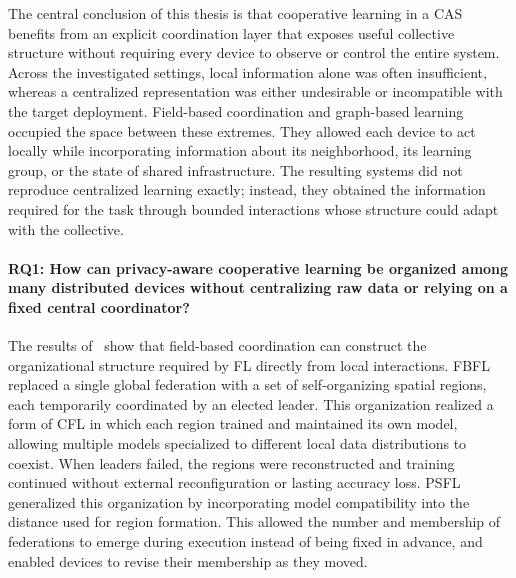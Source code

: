 The central conclusion of this thesis is that cooperative learning in a \gls{CAS} 
 benefits from an explicit coordination layer that exposes useful collective structure 
 without requiring every device to observe or control the entire system.
%
Across the investigated settings, 
 local information alone was often insufficient, 
 whereas a centralized representation was either undesirable or incompatible with the target deployment.
%
Field-based coordination and graph-based learning occupied the space 
 between these extremes. 
% 
They allowed each device to act locally while incorporating information about its neighborhood, 
 its learning group, or the state of shared infrastructure.
%
The resulting systems did not reproduce centralized learning exactly; 
 instead,
 they obtained the information required for the task through bounded interactions 
 whose structure could adapt with the collective.

\paragraph{RQ1: How can privacy-aware cooperative learning be organized among
many distributed devices without centralizing raw data or relying on a fixed
central coordinator?}
%
The results of~ show that field-based coordination 
 can construct the organizational structure required by \gls{FL}
 directly from local interactions.
%
FBFL replaced a single global federation 
 with a set of self-organizing spatial regions, 
 each temporarily coordinated by an elected leader. 
% 
This organization realized a form of \gls{CFL} 
 in which each region trained and maintained its own model, 
 allowing multiple models specialized to different local data distributions to coexist. 
% 
When leaders failed, 
 the regions were reconstructed and training continued 
 without external reconfiguration or lasting accuracy loss.
%
PSFL generalized this organization by incorporating model compatibility 
 into the distance used for region formation. 
% 
This allowed the number and membership of federations 
 to emerge during execution instead of being fixed in advance, 
 and enabled devices to revise their membership as they moved.

